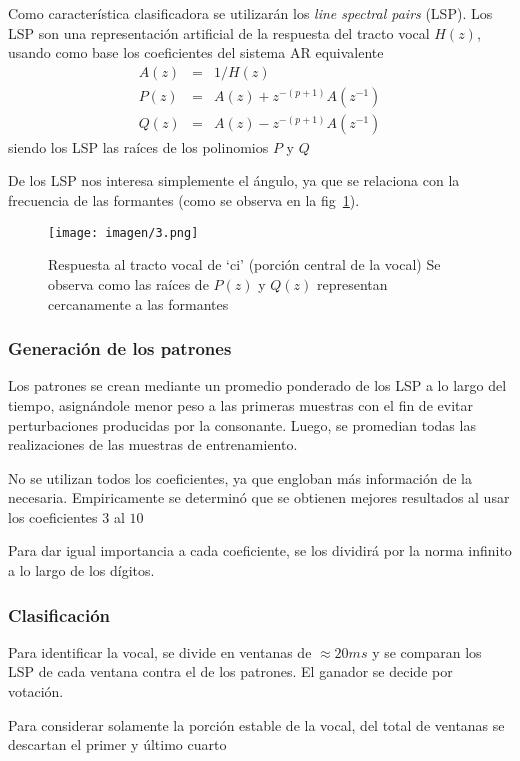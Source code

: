 \documentclass[conference,a4paper,10pt,oneside,final]{tfmpd}
\begin{document}
		Como característica clasificadora se utilizarán los \emph{line spectral pairs} (LSP).
		Los LSP son una representación artificial de la respuesta del tracto vocal $H(z)$,
		usando como base los coeficientes del sistema AR equivalente
		\begin{eqnarray*}
			A(z) &=& 1/H(z) \\
			P(z) &=& A(z) + z^{-(p+1)}A(z^{-1}) \\
			Q(z) &=& A(z) - z^{-(p+1)}A(z^{-1})
		\end{eqnarray*}
		siendo los LSP las raíces de los polinomios $P$ y $Q$

		De los LSP nos interesa simplemente el ángulo, 
		ya que se relaciona con la frecuencia de las formantes 
		(como se observa en la fig~\ref{fig:tracto}).
		\begin{figure}
			\texttt{[image: imagen/3.png]}
			\caption{
				Respuesta al tracto vocal de `ci' (porción central de la vocal)
				Se observa como las raíces de $P(z)$ y $Q(z)$ representan cercanamente a las formantes
			}
			\label{fig:tracto}
		\end{figure}

		\subsubsection{Generación de los patrones}
		Los patrones se crean mediante un promedio ponderado de los LSP
		a lo largo del tiempo, asignándole menor peso a las primeras muestras
		con el fin de evitar perturbaciones producidas por la consonante.
		Luego, se promedian todas las realizaciones de las muestras de entrenamiento.

		No se utilizan todos los coeficientes,
		ya que engloban más información de la necesaria.
		Empiricamente se determinó que se obtienen mejores resultados 
		al usar los coeficientes $3$ al $10$

		Para dar igual importancia a cada coeficiente, se los dividirá por la norma infinito
		a lo largo de los dígitos.
			
		\subsubsection{Clasificación}
		Para identificar la vocal, se divide en ventanas de $\approx 20ms$ y se comparan los
		LSP de cada ventana contra el de los patrones.
		El ganador se decide por votación.


		Para considerar solamente la porción estable de la vocal,
		del total de ventanas se descartan el primer y último cuarto
\end{document}
